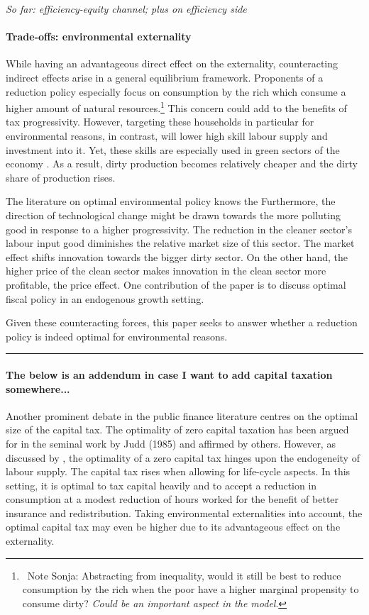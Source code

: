 \textit{So far: efficiency-equity channel; plus on efficiency side}
\paragraph{Trade-offs: environmental externality}
While having an advantageous direct effect on the externality, counteracting indirect effects arise in a general equilibrium framework. Proponents of a reduction policy especially focus on consumption by the rich which consume a higher amount of natural resources.\footnote{\ Note Sonja: Abstracting from inequality, would it still be best to reduce consumption by the rich when the poor have a higher marginal propensity to consume dirty? \textit{Could be an important aspect in the model}.}
This concern could add to the benefits of tax progressivity.
However, targeting these households in particular for environmental reasons, in contrast, will lower high skill labour supply and investment into it. Yet, these skills are especially used in green sectors of the economy \citep{Consoli2016DoCapital}. As a result, dirty production becomes relatively cheaper and the dirty share of production rises. 

The literature on optimal environmental policy knows the 
Furthermore, the direction of technological change might be drawn towards the more polluting good in response to a higher progressivity. The reduction in the cleaner sector's labour input good diminishes the relative market size of this sector. The market effect shifts innovation towards the bigger dirty sector. On the other hand, the higher price of the clean sector makes innovation in the clean sector more profitable, the price effect. 
One contribution of the paper is to discuss optimal fiscal policy in an endogenous growth setting. 

Given these counteracting forces, this paper seeks to answer whether a reduction policy is indeed optimal for environmental reasons. 
\\

\noindent\rule[1ex]{\textwidth}{1pt}
\paragraph{The below is an addendum in case I want to add capital taxation somewhere...}  
Another prominent debate in the public finance literature centres on the optimal size of the capital tax. The optimality of zero capital taxation has been argued for in the seminal work by Judd (1985) and affirmed by others.  However, as discussed by \cite{Conesa2009TaxingAll}, the optimality of a zero capital tax hinges upon the endogeneity of labour supply. The capital tax rises when allowing for life-cycle aspects. In this setting, it is optimal to tax capital heavily and to accept a reduction in consumption at a modest reduction of hours worked for the benefit of better insurance and redistribution. Taking environmental externalities into account, the optimal capital tax may even be higher due to its advantageous effect on the externality.


